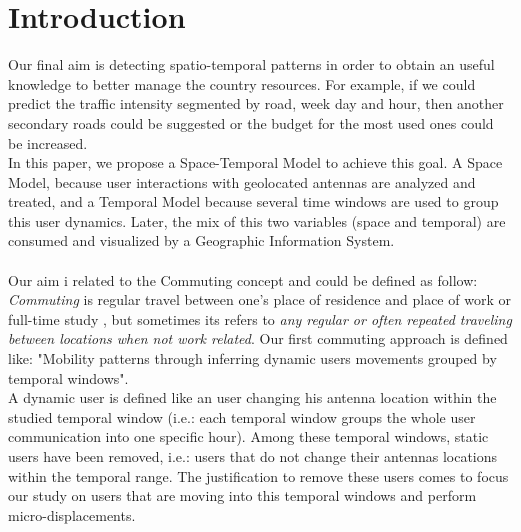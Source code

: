 \newpage
\setcounter{secnumdepth}{1}
\section{Introduction}
Our final aim is detecting spatio-temporal patterns in order to obtain an useful knowledge to better manage the country resources. For example, if we could predict the traffic intensity segmented by road, week day and hour, then another secondary roads could be suggested or the budget for the most used ones could be increased.
\\
In this paper, we propose a Space-Temporal Model to achieve this goal. A Space Model, because user interactions with geolocated antennas are analyzed and treated, and a Temporal Model because several time windows are used to group this user dynamics. Later, the mix of this two variables (space and temporal) are consumed and visualized by a Geographic Information System.
\\
\\
Our aim i related to the Commuting concept and could be defined as follow: \emph{Commuting} is regular travel between one's place of residence and place of work or full-time study \citep{wiki:commuting}, but  sometimes its refers to \emph{any regular or often repeated traveling between locations when not work related}. Our first commuting approach is defined like: "Mobility patterns through inferring dynamic users movements grouped by temporal windows". 
\\
A dynamic user is defined like an user changing his antenna location within the studied temporal window (i.e.: each temporal window groups the whole user communication into one specific hour). Among these temporal windows, static users have been removed, i.e.: users that do not change their antennas locations within the temporal range. The justification to remove these users comes to focus our study on users that are moving into this temporal windows and perform micro-displacements.
